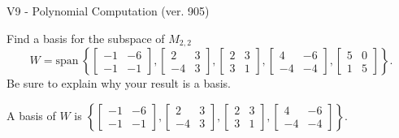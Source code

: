 \begin{exercise}
  \begin{exerciseTitle}V9 - Polynomial Computation (ver. 905)\end{exerciseTitle}
  \begin{exerciseStatement}
    Find a basis for the subspace of \(M_{2,2}\) 
\[W=\mathrm{span}\ \left\{\left[\begin{array}{cc}
-1 & -6 \\
-1 & -1
\end{array}\right] , \left[\begin{array}{cc}
2 & 3 \\
-4 & 3
\end{array}\right] , \left[\begin{array}{cc}
2 & 3 \\
3 & 1
\end{array}\right] , \left[\begin{array}{cc}
4 & -6 \\
-4 & -4
\end{array}\right] , \left[\begin{array}{cc}
5 & 0 \\
1 & 5
\end{array}\right]\right\}.\]
 Be sure to explain why your result is a basis.


  \end{exerciseStatement}
  \begin{exerciseAnswer}
   A basis of \(W\) is  \(\left\{\left[\begin{array}{cc}
-1 & -6 \\
-1 & -1
\end{array}\right] , \left[\begin{array}{cc}
2 & 3 \\
-4 & 3
\end{array}\right] , \left[\begin{array}{cc}
2 & 3 \\
3 & 1
\end{array}\right] , \left[\begin{array}{cc}
4 & -6 \\
-4 & -4
\end{array}\right]\right\}\).
  


  \end{exerciseAnswer}
\end{exercise}